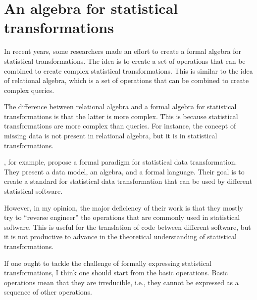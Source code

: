 \section{An algebra for statistical transformations}

In recent years, some researchers made an effort to create a formal algebra for
statistical transformations.  The idea is to create a set of operations that can be
combined to create complex statistical transformations.  This is similar to the idea of
relational algebra, which is a set of operations that can be combined to create complex
queries.

The difference between relational algebra and a formal algebra for statistical
transformations is that the latter is more complex.  This is because statistical
transformations are more complex than queries.  For instance, the concept of missing data
is not present in relational algebra, but it is in statistical transformations.

\textcite{Song2021}, for example, propose a formal paradigm for statistical data
transformation.  They present a data model, an algebra, and a formal language.  Their goal
is to create a standard for statistical data transformation that can be used by different
statistical software.

However, in my opinion, the major deficiency of their work is that they mostly try to
``reverse engineer'' the operations that are commonly used in statistical software.  This
is useful for the translation of code between different software, but it is not productive
to advance in the theoretical understanding of statistical transformations.

If one ought to tackle the challenge of formally expressing statistical transformations, I
think one should start from the basic operations.  Basic operations mean that they are
irreducible, i.e., they cannot be expressed as a sequence of other operations.

